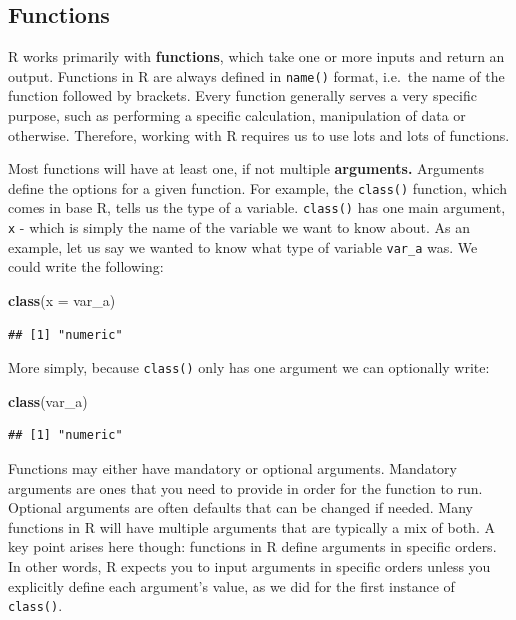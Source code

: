 \documentclass[
]{book}
\newenvironment{Shaded}{\begin{snugshade}}{\end{snugshade}}
\newcommand{\AttributeTok}[1]{\textcolor[rgb]{0.13,0.29,0.53}{#1}}
\newcommand{\FunctionTok}[1]{\textcolor[rgb]{0.13,0.29,0.53}{\textbf{#1}}}
\newcommand{\NormalTok}[1]{#1}
\begin{document}
\subsection{Functions}\label{functions}

R works primarily with \textbf{functions}, which take one or more inputs and return an output. Functions in R are always defined in \texttt{name()} format, i.e.~the name of the function followed by brackets. Every function generally serves a very specific purpose, such as performing a specific calculation, manipulation of data or otherwise. Therefore, working with R requires us to use lots and lots of functions.

Most functions will have at least one, if not multiple \textbf{arguments.} Arguments define the options for a given function. For example, the \texttt{class()} function, which comes in base R, tells us the type of a variable. \texttt{class()} has one main argument, \texttt{x} - which is simply the name of the variable we want to know about. As an example, let us say we wanted to know what type of variable \texttt{var\_a} was. We could write the following:

\begin{Shaded}
\begin{Highlighting}[]
\FunctionTok{class}\NormalTok{(}\AttributeTok{x =}\NormalTok{ var\_a)}
\end{Highlighting}
\end{Shaded}

\begin{verbatim}
## [1] "numeric"
\end{verbatim}

More simply, because \texttt{class()} only has one argument we can optionally write:

\begin{Shaded}
\begin{Highlighting}[]
\FunctionTok{class}\NormalTok{(var\_a)}
\end{Highlighting}
\end{Shaded}

\begin{verbatim}
## [1] "numeric"
\end{verbatim}

Functions may either have mandatory or optional arguments. Mandatory arguments are ones that you need to provide in order for the function to run. Optional arguments are often defaults that can be changed if needed. Many functions in R will have multiple arguments that are typically a mix of both. A key point arises here though: functions in R define arguments in specific orders. In other words, R expects you to input arguments in specific orders unless you explicitly define each argument's value, as we did for the first instance of \texttt{class()}.
\end{document}
